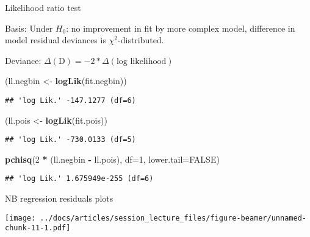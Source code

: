 \documentclass[
  ignorenonframetext,
]{beamer}
\newenvironment{Shaded}{\begin{snugshade}}{\end{snugshade}}
\newcommand{\DataTypeTok}[1]{\textcolor[rgb]{0.13,0.29,0.53}{#1}}
\newcommand{\DecValTok}[1]{\textcolor[rgb]{0.00,0.00,0.81}{#1}}
\newcommand{\KeywordTok}[1]{\textcolor[rgb]{0.13,0.29,0.53}{\textbf{#1}}}
\newcommand{\NormalTok}[1]{#1}
\newcommand{\OperatorTok}[1]{\textcolor[rgb]{0.81,0.36,0.00}{\textbf{#1}}}
\newcommand{\OtherTok}[1]{\textcolor[rgb]{0.56,0.35,0.01}{#1}}
\newcommand{\StringTok}[1]{\textcolor[rgb]{0.31,0.60,0.02}{#1}}
\begin{document}
\begin{frame}[fragile]{Likelihood ratio test}
\protect\hypertarget{likelihood-ratio-test}{}

Basis: Under \(H_0\): no improvement in fit by more complex model,
difference in model residual deviances is \(\chi^2\)-distributed.

Deviance:
\(\Delta (\textrm{D}) = -2 * \Delta (\textrm{log likelihood})\)

\begin{Shaded}
\begin{Highlighting}[]
\NormalTok{(ll.negbin <-}\StringTok{ }\KeywordTok{logLik}\NormalTok{(fit.negbin))}
\end{Highlighting}
\end{Shaded}

\begin{verbatim}
## 'log Lik.' -147.1277 (df=6)
\end{verbatim}

\begin{Shaded}
\begin{Highlighting}[]
\NormalTok{(ll.pois <-}\StringTok{ }\KeywordTok{logLik}\NormalTok{(fit.pois))}
\end{Highlighting}
\end{Shaded}

\begin{verbatim}
## 'log Lik.' -730.0133 (df=5)
\end{verbatim}

\begin{Shaded}
\begin{Highlighting}[]
\KeywordTok{pchisq}\NormalTok{(}\DecValTok{2} \OperatorTok{*}\StringTok{ }\NormalTok{(ll.negbin }\OperatorTok{-}\StringTok{ }\NormalTok{ll.pois), }\DataTypeTok{df=}\DecValTok{1}\NormalTok{, }
       \DataTypeTok{lower.tail=}\OtherTok{FALSE}\NormalTok{)}
\end{Highlighting}
\end{Shaded}

\begin{verbatim}
## 'log Lik.' 1.675949e-255 (df=6)
\end{verbatim}

\end{frame}

\begin{frame}{NB regression residuals plots}
\protect\hypertarget{nb-regression-residuals-plots}{}

\texttt{[image: ../docs/articles/session\_lecture\_files/figure-beamer/unnamed-chunk-11-1.pdf]}

\end{frame}
\end{document}
